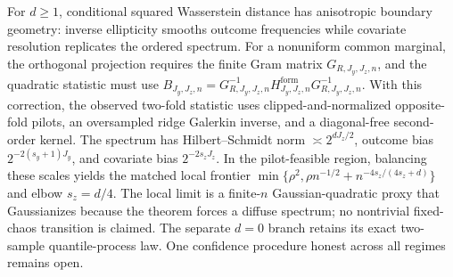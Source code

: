 For \(d\ge1\), conditional squared Wasserstein distance has anisotropic boundary geometry: inverse ellipticity smooths outcome frequencies while covariate resolution replicates the ordered spectrum.  For a nonuniform common marginal, the orthogonal projection requires the finite Gram matrix \(G_{R,J_y,J_z,n}\), and the quadratic statistic must use \(B_{J_y,J_z,n}=G_{R,J_y,J_z,n}^{-1}H^{\mathrm{form}}_{J_y,J_z,n}G_{R,J_y,J_z,n}^{-1}\).  With this correction, the observed two-fold statistic uses clipped-and-normalized opposite-fold pilots, an oversampled ridge Galerkin inverse, and a diagonal-free second-order kernel.  The spectrum has Hilbert--Schmidt norm \(\asymp2^{dJ_z/2}\), outcome bias \(2^{-2(s_y+1)J_y}\), and covariate bias \(2^{-2s_zJ_z}\).  In the pilot-feasible region, balancing these scales yields the matched local frontier \(\min\{\rho^2,\rho n^{-1/2}+n^{-4s_z/(4s_z+d)}\}\) and elbow \(s_z=d/4\).  The local limit is a finite-\(n\) Gaussian-quadratic proxy that Gaussianizes because the theorem forces a diffuse spectrum; no nontrivial fixed-chaos transition is claimed.  The separate \(d=0\) branch retains its exact two-sample quantile-process law.  One confidence procedure honest across all regimes remains open.